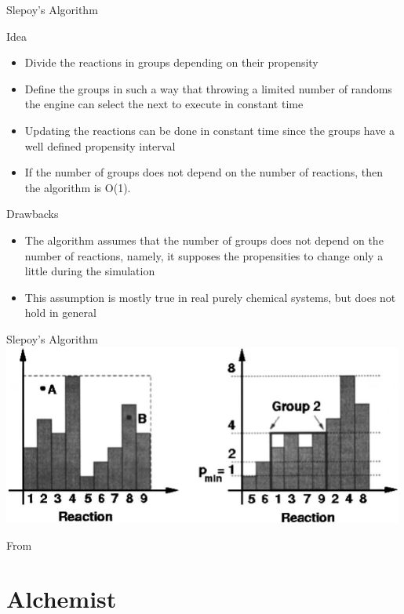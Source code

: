 \documentclass[presentation]{beamer}
\begin{document}
\begin{frame}{Slepoy's Algorithm}
 \begin{block}{Idea}
  \begin{itemize}
   \item Divide the reactions in groups depending on their propensity
   \item Define the groups in such a way that throwing a limited number of randoms the engine can select the next to execute in constant time
   \item Updating the reactions can be done in constant time since the groups have a well defined propensity interval
   \item If the number of groups does not depend on the number of reactions, then the algorithm is O(1).
  \end{itemize}
 \end{block}
 \begin{block}{Drawbacks}
  \begin{itemize}
   \item The algorithm assumes that the number of groups does not depend on the number of reactions, namely, it supposes the propensities to change only a little during the simulation
   \item This assumption is mostly true in real purely chemical systems, but does not hold in general
  \end{itemize}
 \end{block}
\end{frame}

\begin{frame}{Slepoy's Algorithm}
  \centering
  \includegraphics[width=0.99\textwidth]{img/slepoy}

From \cite{SlepoyJPC2008}
\end{frame}


\section{Alchemist}
\end{document}
